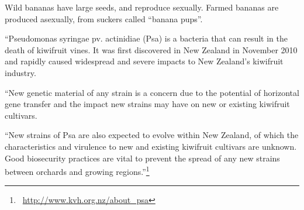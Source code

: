\documentclass{exam}
\begin{document}
\begin{questions}
  \question {[NZQA 2017]} Wild bananas have large seeds, and reproduce sexually. Farmed bananas are produced asexually, from suckers called “banana pups”.
  \question ``Pseudomonas syringae pv. actinidiae (Psa) is a bacteria that can result in the death of kiwifruit vines. It was first discovered in
            New Zealand in November 2010 and rapidly caused widespread and severe impacts to New Zealand's kiwifruit industry.

            ``New genetic material of any strain is a concern due to the potential of horizontal gene transfer and the impact new strains may have
            on new or existing kiwifruit cultivars.

            ``New strains of Psa are also expected to evolve within New Zealand, of which the characteristics and virulence to new and existing
            kiwifruit cultivars are unknown. Good biosecurity practices are vital to prevent the spread of any new strains between orchards and
            growing regions.''\footnote{~\url{http://www.kvh.org.nz/about_psa}}


\end{questions}
\end{document}
